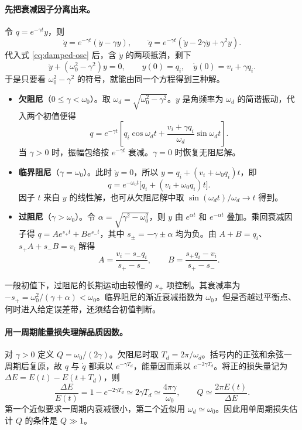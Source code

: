 \paragraph{先把衰减因子分离出来。}
令 $q=e^{-\gamma t}y$，则
\[
\dot q=e^{-\gamma t}(\dot y-\gamma y),\qquad
\ddot q=e^{-\gamma t}(\ddot y-2\gamma\dot y+\gamma^2y).
\]
代入式 \eqref{eq:damped-osc} 后，含 $\dot y$ 的两项抵消，剩下
\[
\ddot y+(\omega_0^2-\gamma^2)y=0,\qquad
y(0)=q_i,\quad \dot y(0)=v_i+\gamma q_i.
\]
于是只要看 $\omega_0^2-\gamma^2$ 的符号，就能由同一个方程得到三种解。

\begin{itemize}
\item \textbf{欠阻尼}（$0\le\gamma<\omega_0$）。取 $\omega_d=\sqrt{\omega_0^2-\gamma^2}$。$y$ 是角频率为 $\omega_d$ 的简谐振动，代入两个初值便得
\[
q=e^{-\gamma t}
\left[q_i\cos\omega_dt+\frac{v_i+\gamma q_i}{\omega_d}\sin\omega_dt\right].
\]
当 $\gamma>0$ 时，振幅包络按 $e^{-\gamma t}$ 衰减。$\gamma=0$ 时恢复无阻尼解。
\item \textbf{临界阻尼}（$\gamma=\omega_0$）。此时 $\ddot y=0$，所以 $y=q_i+(v_i+\omega_0q_i)t$，即
\[
q=e^{-\omega_0t}\big[q_i+(v_i+\omega_0q_i)t\big].
\]
因子 $t$ 来自 $y$ 的线性解，也可从欠阻尼解中取 $\sin(\omega_dt)/\omega_d\to t$ 得到。
\item \textbf{过阻尼}（$\gamma>\omega_0$）。令 $\alpha=\sqrt{\gamma^2-\omega_0^2}$，则 $y$ 由 $e^{\alpha t}$ 和 $e^{-\alpha t}$ 叠加。乘回衰减因子得 $q=Ae^{s_+t}+Be^{s_-t}$，其中 $s_\pm=-\gamma\pm\alpha$ 均为负。由 $A+B=q_i$、$s_+A+s_-B=v_i$ 解得
\[
A=\frac{v_i-s_-q_i}{s_+-s_-},\qquad
B=\frac{s_+q_i-v_i}{s_+-s_-}.
\]
\end{itemize}
一般初值下，过阻尼的长期运动由较慢的 $s_+$ 项控制。其衰减率为 $-s_+=\omega_0^2/(\gamma+\alpha)<\omega_0$。临界阻尼的渐近衰减指数为 $\omega_0$，但是否越过平衡点、何时进入给定误差带，还须结合初值判断。

\paragraph{用一周期能量损失理解品质因数。}
对 $\gamma>0$ 定义 $Q=\omega_0/(2\gamma)$。欠阻尼时取 $T_d=2\pi/\omega_d$。括号内的正弦和余弦一周期后复原，故 $q$ 与 $\dot q$ 都乘以 $e^{-\gamma T_d}$，能量因而乘以 $e^{-2\gamma T_d}$。将正的损失量记为 $\Delta E=E(t)-E(t+T_d)$，则
\[
\frac{\Delta E}{E(t)}=1-e^{-2\gamma T_d}
\simeq 2\gamma T_d\simeq\frac{4\pi\gamma}{\omega_0},\qquad
Q\simeq\frac{2\pi E(t)}{\Delta E}.
\]
第一个近似要求一周期内衰减很小，第二个近似用 $\omega_d\simeq\omega_0$。因此用单周期损失估计 $Q$ 的条件是 $Q\gg1$。

